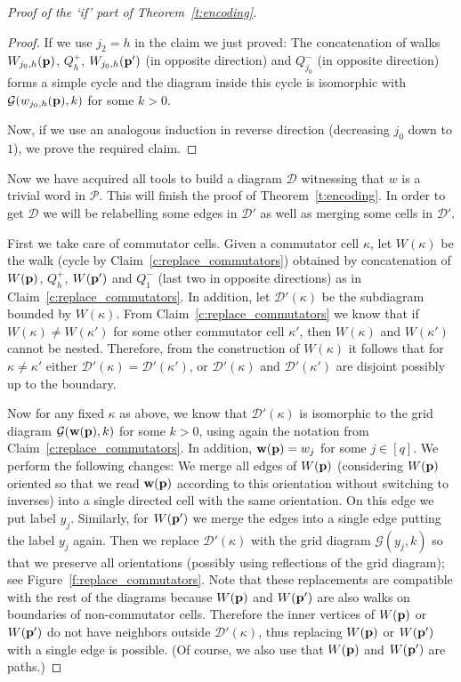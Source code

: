 \documentclass[10pt,a4paper]{article}
\theoremstyle{definition}
\theoremstyle{remark}
\newcommand\DD{\mathcal{D}}
\newcommand\GG{\mathcal{G}}
\newcommand\PP{\mathcal{P}}
\newcommand\makevec[1]{{\bf #1}}
\def \pp {\makevec{p}}
\def \ww {\makevec{w}}
\begin{document}
\begin{proof}[Proof of the `if' part of Theorem~\ref{t:encoding}]
\begin{proof}
  If we use $j_2 = h$ in the claim we just proved: The concatenation of walks
  $W_{j_0,h}(\pp)$,
  $Q^+_{h}$, $W_{j_0,h}(\pp')$ (in opposite direction) and $Q^-_{j_0}$ (in
  opposite direction) forms a simple cycle and the diagram inside this
  cycle is isomorphic with $\GG(w_{j_0,h}(\pp),k)$ for some $k > 0$.

  Now, if we use an analogous induction in reverse direction (decreasing $j_0$
  down to $1$), we prove the required claim.
\end{proof}



Now we have acquired all tools to build a diagram $\DD$ witnessing that $w$ is
a trivial word in $\PP$. This will finish the proof of Theorem~\ref{t:encoding}.
In order to get $\DD$ we will be relabelling some edges in $\DD'$ as well as
merging some cells in $\DD'$.

First we take care of commutator cells. Given a commutator cell $\kappa$, let
$W(\kappa)$ be the walk (cycle by Claim~\ref{c:replace_commutators}) obtained
by concatenation of $W(\pp)$, $Q^+_h$,
$W(\pp')$ and $Q_1^{-}$ (last two in opposite directions) as in
Claim~\ref{c:replace_commutators}. In addition, let $\DD'(\kappa)$ be the
subdiagram bounded by $W(\kappa)$. From Claim~\ref{c:replace_commutators} we
know that if $W(\kappa) \neq W(\kappa')$ for some other commutator cell
$\kappa'$, then $W(\kappa)$ and $W(\kappa')$ cannot be nested. Therefore, from
the construction of $W(\kappa)$ it follows that for $\kappa \neq \kappa'$
either $\DD'(\kappa) = \DD'(\kappa')$, or $\DD'(\kappa)$ and $\DD'(\kappa')$ are
disjoint possibly up to the boundary.

Now for any fixed $\kappa$ as above, we know that $\DD'(\kappa)$ is isomorphic
to the grid diagram $\GG(\ww(\pp), k)$ for some $k > 0$, using again the notation
from Claim~\ref{c:replace_commutators}. In addition, $\ww(\pp) = w_j$ for some
$j \in [q]$. We perform the following changes: We merge all edges of $W(\pp)$
(considering $W(\pp)$ oriented so that we read $\ww(\pp)$ according to this
orientation without switching to inverses) into a single directed cell with the
same orientation. On this edge we put label $y_j$. Similarly, for $W(\pp')$ we
merge the edges into a single edge putting the label $y_j$ again. Then we
replace $\DD'(\kappa)$ with the grid diagram $\GG(y_j, k)$ so that we preserve
all orientations (possibly using reflections of the grid diagram); see
Figure~\ref{f:replace_commutators}. Note that these replacements are compatible
with the rest of the diagrams because $W(\pp)$ and $W(\pp')$ are also walks on
boundaries of non-commutator cells. Therefore the inner vertices of $W(\pp)$ or
$W(\pp')$ do not have neighbors outside $\DD'(\kappa)$, thus replacing $W(\pp)$
or $W(\pp')$ with a single edge is possible. (Of course, we also use that
$W(\pp)$ and $W(\pp')$ are paths.)


\end{proof}
\end{document}
